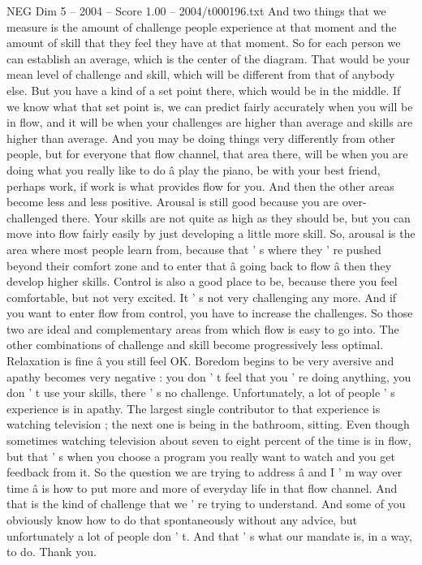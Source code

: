 \begin{textsample}{NEG Dim 5 – 2004 – Score 1.00 – 2004/t000196.txt}
And two things that we measure is the amount of challenge people experience at that moment and the amount of skill that they feel they have at that moment.
So for each person we can establish an average, which is the center of the diagram.
That would be your mean level of challenge and skill, which will be different from that of anybody else.
But you have a kind of a set point there, which would be in the middle.
If we know what that set point is, we can predict fairly accurately when you will be in flow, and it will be when your challenges are higher than average and skills are higher than average.
And you may be doing things very differently from other people, but for everyone that flow channel, that area there, will be when you are doing what you really like to do â play the piano, be with your best friend, perhaps work, if work is what provides flow for you.
And then the other areas become less and less positive.
Arousal is still good because you are over-challenged there.
Your skills are not quite as high as they should be, but you can move into flow fairly easily by just developing a little more skill.
So, arousal is the area where most people learn from, because that ' s where they ' re pushed beyond their comfort zone and to enter that â going back to flow â then they develop higher skills.
Control is also a good place to be, because there you feel comfortable, but not very excited.
It ' s not very challenging any more.
And if you want to enter flow from control, you have to increase the challenges.
So those two are ideal and complementary areas from which flow is easy to go into.
The other combinations of challenge and skill become progressively less optimal.
Relaxation is fine â you still feel OK.
Boredom begins to be very aversive and apathy becomes very negative : you don ' t feel that you ' re doing anything, you don ' t use your skills, there ' s no challenge.
Unfortunately, a lot of people ' s experience is in apathy.
The largest single contributor to that experience is watching television ; the next one is being in the bathroom, sitting.
Even though sometimes watching television about seven to eight percent of the time is in flow, but that ' s when you choose a program you really want to watch and you get feedback from it.
So the question we are trying to address â and I ' m way over time â is how to put more and more of everyday life in that flow channel.
And that is the kind of challenge that we ' re trying to understand.
And some of you obviously know how to do that spontaneously without any advice, but unfortunately a lot of people don ' t.
And that ' s what our mandate is, in a way, to do.
Thank you.

\end{textsample}
